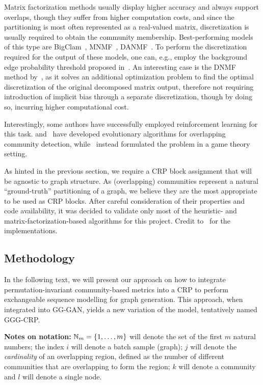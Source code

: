 Matrix factorization methods usually display higher accuracy and always support overlaps, though they suffer from higher computation costs, and since the partitioning is most often represented as a real-valued matrix, discretization is usually required to obtain the community membership. Best-performing models of this type are BigClam~\cite{yang_overlapping_2013}, MNMF~\cite{wang_community_2017}, DANMF~\cite{ye_deep_2018}. To perform the discretization required for the output of these models, one can, e.g., employ the background edge probability threshold proposed in~\cite{jia_communitygan_2019}. An interesting case is the DNMF method by~\cite{ye_discrete_2019}, as it solves an additional optimization problem to find the optimal discretization of the original decomposed matrix output, therefore not requiring introduction of implicit bias through a separate discretization, though by doing so, incurring higher computational cost.

Interestingly, some authors have successfully employed reinforcement learning for this task.
\cite{zhang_mixed_2017} and~\cite{bello-orgaz_multi-objective_2018} have developed evolutionary algorithms for overlapping community detection, while~\cite{wang_effective_2021} instead formulated the problem in a game theory setting. 

As hinted in the previous section, we require a CRP block assignment that will be agnostic to graph structure. As (overlapping) communities represent a natural \enquote{ground-truth} partitioning of a graph, we believe they are the most appropriate to be used as CRP blocks. After careful consideration of their properties and code availability, it was decided to validate only most of the heuristic- and matrix-factorization-based algorithms for this project. Credit to~\cite{csardi_igraph_2006, rozemberczki_karate_2020, li_local_2018, janchevski_dnmf-python_2022} for the implementations.

\subsection{Methodology}
\label{sec:methodology_gggcrp}

In the following text, we will present our approach on how to integrate permutation-invariant community-based metrics into a CRP to perform exchangeable sequence modelling for graph generation. This approach, when integrated into GG-GAN, yields a new variation of the model, tentatively named GGG-CRP. 

\textbf{Notes on notation:} $\mathbb{N}_{m} = \mathopen{}\left\{1,\dots,m\right\}$ will denote the set of the first $m$ natural numbers; the index $i$ will denote a batch sample (graph); $j$ will denote the \emph{cardinality} of an overlapping region, defined as the number of different communities that are overlapping to form the region; $k$ will denote a community and $l$ will denote a single node.

